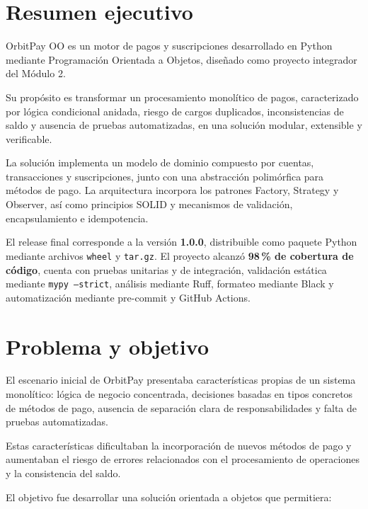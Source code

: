 \documentclass[11pt,a4paper]{article}
\begin{document}
\section{Resumen ejecutivo}

OrbitPay OO es un motor de pagos y suscripciones desarrollado
en Python mediante Programación Orientada a Objetos, diseñado
como proyecto integrador del Módulo 2.

Su propósito es transformar un procesamiento monolítico de pagos,
caracterizado por lógica condicional anidada, riesgo de cargos
duplicados, inconsistencias de saldo y ausencia de pruebas
automatizadas, en una solución modular, extensible y verificable.

La solución implementa un modelo de dominio compuesto por
cuentas, transacciones y suscripciones, junto con una abstracción
polimórfica para métodos de pago. La arquitectura incorpora los
patrones Factory, Strategy y Observer, así como principios SOLID
y mecanismos de validación, encapsulamiento e idempotencia.

El release final corresponde a la versión \textbf{1.0.0},
distribuible como paquete Python mediante archivos
\texttt{wheel} y \texttt{tar.gz}. El proyecto alcanzó
\textbf{98\,\% de cobertura de código}, cuenta con pruebas
unitarias y de integración, validación estática mediante
\texttt{mypy --strict}, análisis mediante Ruff, formateo
mediante Black y automatización mediante pre-commit y
GitHub Actions.

\section{Problema y objetivo}

El escenario inicial de OrbitPay presentaba características
propias de un sistema monolítico: lógica de negocio concentrada,
decisiones basadas en tipos concretos de métodos de pago,
ausencia de separación clara de responsabilidades y falta de
pruebas automatizadas.

Estas características dificultaban la incorporación de nuevos
métodos de pago y aumentaban el riesgo de errores relacionados
con el procesamiento de operaciones y la consistencia del saldo.

El objetivo fue desarrollar una solución orientada a objetos
que permitiera:
\end{document}
